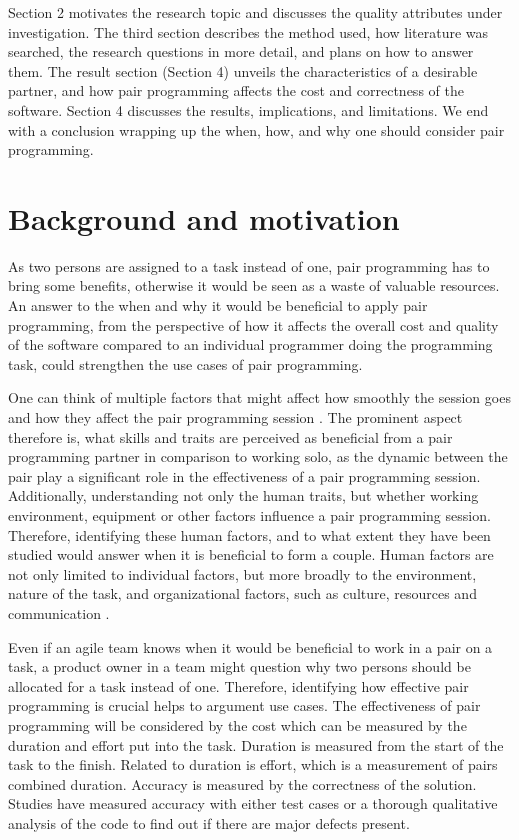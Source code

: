 \documentclass[conference]{IEEEtran}
\begin{document}
Section 2 motivates the research topic and discusses the quality attributes under investigation. The third section describes the method used, how literature was searched, the research questions in more detail, and plans on how to answer them. The result section (Section 4) unveils the characteristics of a desirable partner, and how pair programming affects the cost and correctness of the software. Section 4 discusses the results, implications, and limitations. We end with a conclusion wrapping up the when, how, and why one should consider pair programming.

\section{Background and motivation}

As two persons are assigned to a task instead of one, pair programming has to bring some benefits, otherwise it would be seen as a waste of valuable resources. An answer to the when and why it would be beneficial to apply pair programming, from the perspective of how it affects the overall cost and quality of the software compared to an individual programmer doing the programming task, could strengthen the use cases of pair programming.

One can think of multiple factors that might affect how smoothly the session goes and how they affect the pair programming session \cite{10.1145/1414004.1414026}. The prominent aspect therefore is, what skills and traits are perceived as beneficial from a pair programming partner in comparison to working solo, as the dynamic between the pair play a significant role in the effectiveness of a pair programming session. Additionally, understanding not only the human traits, but whether working environment, equipment or other factors influence a pair programming session. Therefore, identifying these human factors, and to what extent they have been studied would answer when it is beneficial to form a couple. Human factors are not only limited to individual factors, but more broadly to the environment, nature of the task, and organizational factors, such as culture, resources and communication \cite{hseIntroductionHuman}.

Even if an agile team knows when it would be beneficial to work in a pair on a task, a product owner in a team might question why two persons should be allocated for a task instead of one. Therefore, identifying how effective pair programming is crucial helps to argument use cases. The effectiveness of pair programming will be considered by the cost which can be measured by the duration and effort put into the task. Duration is measured from the start of the task to the finish. Related to duration is effort, which is a measurement of pairs combined duration. Accuracy is measured by the correctness of the solution. Studies have measured accuracy with either test cases or a thorough qualitative analysis of the code to find out if there are major defects present. 
\end{document}
